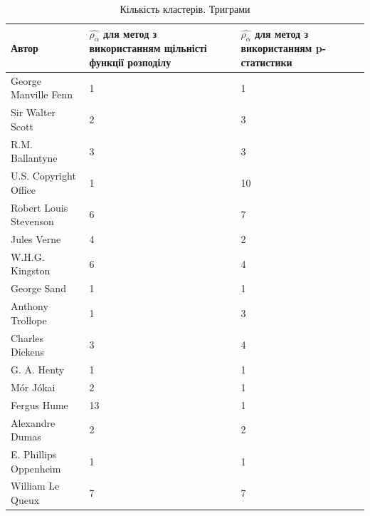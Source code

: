 \documentclass[12pt, a4paper]{extarticle}
\begin{document}
\begin{center}
\begin{table}
\begin{tabular}{|p{11em}|p{10em}|p{10em}|}
\hline
Автор & $\hat{\rho_\alpha}$ для метод з використанням щільністі функції розподілу & $\hat{\rho_\alpha}$ для метод з використанням p-статистики\\
\hline
George Manville Fenn & 1 & 1\\
Sir Walter Scott & 2 & 3\\
R.M. Ballantyne & 3 & 3\\
U.S. Copyright Office & 1 & 10\\
Robert Louis Stevenson & 6 & 7\\
Jules Verne & 4 & 2\\
W.H.G. Kingston & 6 & 4\\
George Sand & 1 & 1\\
Anthony Trollope & 1 & 3\\
Charles Dickens & 3 & 4\\
G. A. Henty & 1 & 1\\
Mór Jókai & 2 & 1\\
Fergus Hume & 13& 1\\
Alexandre Dumas & 2 & 2\\
E. Phillips Oppenheim & 1 & 1\\
William Le Queux & 7 & 7\\
\hline
\end{tabular}
\caption{Кількість кластерів. Триграми}
\label{tab:10}
\end{table}
\end{center}
\end{document}
